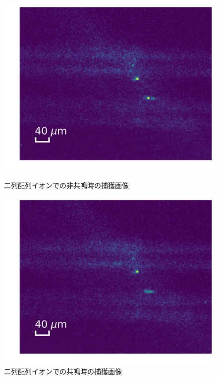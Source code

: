 \begin{figure}[h]
	\begin{minipage}{0.5\linewidth}
		\begin{center}
			\includegraphics[width = 0.98\columnwidth]{./results/figure/2D_off_resonance.jpg}
			\caption{二列配列イオンでの非共鳴時の捕獲画像}
			\label{fig:2D_off_resonance}
		\end{center}
	\end{minipage}
	\begin{minipage}{0.5\linewidth}
		\begin{center}
			\includegraphics[width = 0.98\columnwidth]{./results/figure/2D_resonance.jpg}
			\caption{二列配列イオンでの共鳴時の捕獲画像}
			\label{fig:2D_resonance}
		\end{center}
	\end{minipage}
\end{figure}